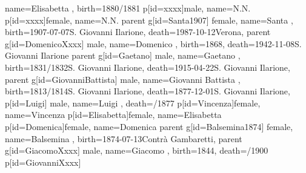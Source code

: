 \documentclass{article}
\begin{document}
\begin{midpage}
\begin{center}
\begin{genealogypicture}
{{{{{{                        name={Elisabetta },
                        birth={1880/1881}{}
                    }
                    p[id=xxxx]{male, name={N.N.}}
                    p[id=xxxx]{female, name={N.N.}}
                }
            }
            parent{
                g[id=Santa1907]{
                    female,
                    name={Santa },
                    birth={1907-07-07}{S. Giovanni Ilarione},
                    death={1987-10-12}{Verona},
                }
                parent{
                    g[id=DomenicoXxxx]{
                        male,
                        name={Domenico },
                        birth={1868}{},
                        death={1942-11-08}{S. Giovanni Ilarione}
                    }
                    parent{
                        g[id=Gaetano]{
                            male,
                            name={Gaetano },
                            birth={1831/1832}{S. Giovanni Ilarione},
                            death={1915-04-22}{S. Giovanni Ilarione},
                        }
                        parent{
                            g[id=GiovanniBattista]{
                                male,
                                name={Giovanni Battista },
                                birth={1813/1814}{S. Giovanni Ilarione},
                                death={1877-12-01}{S. Giovanni Ilarione},
                            }
                            p[id=Luigi]{
                                male,
                                name={Luigi },
                                death={/1877}{}
                            }
                            p[id=Vincenza]{female, name={Vincenza }}
                        }
                        p[id=Elisabetta]{female, name={Elisabetta }}
                    }
                    p[id=Domenica]{female, name={Domenica }}
                }
                parent{
                    g[id=Balsemina1874]{
                        female,
                        name={Balsemina },
                        birth={1874-07-13}{Contrà Gambaretti},
                    }
                    parent{
                        g[id=GiacomoXxxx]{
                            male,
                            name={Giacomo },
                            birth={1844}{},
                            death={/1900}{}
                        }
                        p[id=GiovanniXxxx]{
}}}}}}}
\end{genealogypicture}
\end{center}
\end{midpage}
\end{document}
